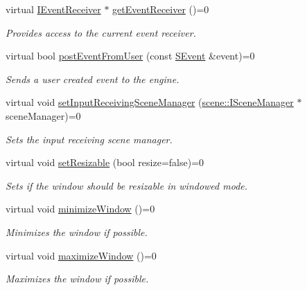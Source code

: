 \begin{DoxyCompactItemize}
virtual \hyperlink{classirr_1_1IEventReceiver}{I\+Event\+Receiver} $\ast$ \hyperlink{classirr_1_1IrrlichtDevice_a26227e20e46915942d067532c61df42b}{get\+Event\+Receiver} ()=0
\begin{DoxyCompactList}\small\item\em Provides access to the current event receiver. \end{DoxyCompactList}\item 
virtual bool \hyperlink{classirr_1_1IrrlichtDevice_abf859e39f017b0403c6ed331e48e01df}{post\+Event\+From\+User} (const \hyperlink{structirr_1_1SEvent}{S\+Event} \&event)=0
\begin{DoxyCompactList}\small\item\em Sends a user created event to the engine. \end{DoxyCompactList}\item 
virtual void \hyperlink{classirr_1_1IrrlichtDevice_a22ab84f23050dbef122f16a33aa9b91d}{set\+Input\+Receiving\+Scene\+Manager} (\hyperlink{classirr_1_1scene_1_1ISceneManager}{scene\+::\+I\+Scene\+Manager} $\ast$scene\+Manager)=0
\begin{DoxyCompactList}\small\item\em Sets the input receiving scene manager. \end{DoxyCompactList}\item 
virtual void \hyperlink{classirr_1_1IrrlichtDevice_a4911502bd085d2d87474ff12959bc341}{set\+Resizable} (bool resize=false)=0
\begin{DoxyCompactList}\small\item\em Sets if the window should be resizable in windowed mode. \end{DoxyCompactList}\item 
\mbox{\label{classirr_1_1IrrlichtDevice_a23e31ff31f564d5e715edc901e519311}} 
virtual void \hyperlink{classirr_1_1IrrlichtDevice_a23e31ff31f564d5e715edc901e519311}{minimize\+Window} ()=0
\begin{DoxyCompactList}\small\item\em Minimizes the window if possible. \end{DoxyCompactList}\item 
\mbox{\label{classirr_1_1IrrlichtDevice_a24cb8ac97c16114ff7df1f0ec604a219}} 
virtual void \hyperlink{classirr_1_1IrrlichtDevice_a24cb8ac97c16114ff7df1f0ec604a219}{maximize\+Window} ()=0
\begin{DoxyCompactList}\small\item\em Maximizes the window if possible. \end{DoxyCompactList}\item 

\end{DoxyCompactItemize}
